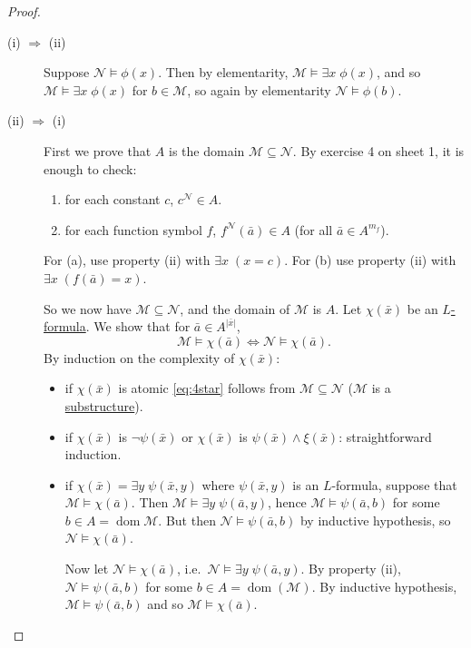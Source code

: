 \documentclass{article}
\let\models\vDash
\DeclareMathOperator{\dom}{dom}
\begin{document}
\begin{proof}\leavevmode
  \begin{description}
    \item [(i) $\Rightarrow$ (ii)] Suppose $\mathcal{N} \models \phi(x)$.
      Then by elementarity, $\mathcal{M} \models \exists x \; \phi(x)$, and so $\mathcal{M} \models \exists x \; \phi(x)$ for $b \in \mathcal{M}$, so again by elementarity $\mathcal{N} \models \phi(b)$.
    \item [(ii) $\Rightarrow$ (i)] First we prove that $A$ is the domain $\mathcal{M} \subseteq \mathcal{N}$.
      By exercise 4 on sheet 1, it is enough to check:
      \begin{enumerate}[label=(\alph*)]
        \item for each constant $c$, $c^\mathcal{N} \in A$.
        \item for each function symbol $f$, $f^{\mathcal{N}}(\bar{a}) \in A$ (for all $\bar{a} \in A^{m_f}$).
      \end{enumerate}
      For (a), use property (ii) with $\exists x\; (x = c)$. For (b) use property (ii) with $\exists x\; (f(\bar{a}) = x)$.

      So we now have $\mathcal{M} \subseteq \mathcal{N}$, and the domain of $\mathcal{M}$ is $A$.
      Let $\chi(\bar{x})$ be an \hyperlink{def:form}{$L$-formula}.
      We show that for $\bar{a} \in A^{|\bar{x}|}$,
      \begin{equation*}
        \mathcal{M} \models \chi(\bar{a}) \iff \mathcal{N} \models \chi(\bar{a}). \tag{$*$} \label{eq:4star}
      \end{equation*}
      By induction on the complexity of $\chi(\bar{x})$:
      \begin{itemize}[label=--]
        \item if $\chi(\bar{x})$ is atomic \eqref{eq:4star} follows from $\mathcal{M} \subseteq \mathcal{N}$ ($\mathcal{M}$ is a \hyperlink{def:subs}{substructure}).
        \item if $\chi(\bar{x})$ is $\neg \psi(\bar{x})$ or $\chi(\bar{x})$ is $\psi(\bar{x}) \wedge \xi(\bar{x})$: straightforward induction.
        \item if $\chi(\bar{x}) = \exists y \; \psi(\bar{x},y)$ where $\psi(\bar{x},y)$ is an $L$-formula, suppose that $\mathcal{M} \models \chi(\bar{a})$.
          Then $\mathcal{M} \models \exists y \; \psi(\bar{a}, y)$, hence $\mathcal{M} \models \psi(\bar{a},b)$ for some $b \in A = \dom \mathcal{M}$.
          But then $\mathcal{N} \models \psi(\bar{a},b)$ by inductive hypothesis, so $\mathcal{N} \models \chi(\bar{a})$.

          Now let $\mathcal{N} \models \chi(\bar{a})$, i.e.\ $\mathcal{N} \models \exists y \; \psi(\bar{a},y)$.
          By property (ii), $\mathcal{N} \models \psi(\bar{a},b)$ for some $b \in A = \dom(\mathcal{M})$.
          By inductive hypothesis, $\mathcal{M} \models \psi(\bar{a},b)$ and so $\mathcal{M} \models \chi(\bar{a})$. \qedhere
      \end{itemize}
  \end{description}
\end{proof}
\end{document}
